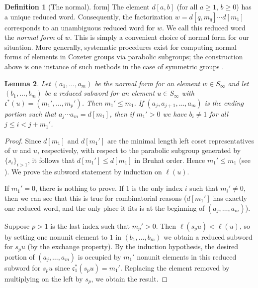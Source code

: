 \documentclass{amsart}
\newtheorem{lemma}{Lemma}[subsection]
\theoremstyle{definition}
\newtheorem{definition}[lemma]{Definition}
\theoremstyle{remark}
\numberwithin{equation}{subsection}
\newcommand{\code}{\mathfrak{c}}
\begin{document}
\begin{definition}[The normal] form]
The element $d[a,b]$ (for all $a\geq 1$, $b\geq 0$) has a unique reduced word. Consequently, the factorization $w=d[q,m_q]\cdots d[m_1]$ corresponds to an unambiguous reduced word for $w$. We call this reduced word the \emph{normal form} of $w$. This is simply a convenient choice of normal form for our situation. More generally, systematic procedures exist for computing normal forms of elements in Coxeter groups via parabolic subgroups; the construction above is one instance of such methods in the case of symmetric groups \cite{combcox}.
\end{definition}

\begin{lemma} \label{lemma:subword}
Let $(a_1,\ldots,a_m)$ be the normal form for an element $w\in S_\infty$ and let $(b_1,\ldots,b_m)$ be a reduced subword for an element $u\in S_\infty$ with $\code^*(u)=(m_1',\ldots,m_p')$. Then $m_1'\leq m_1$. If $(a_j,a_{j+1},\ldots,a_m)$ is the ending portion such that $a_j\cdots a_m=d[m_1]$, then if $m_1'>0$ we have $b_i\neq 1$ for all $j\leq i<j+m_1'$.
\end{lemma}
\begin{proof}
Since $d[m_1]$ and $d[m_1']$ are the minimal length left coset representatives of $w$ and $u$, respectively, with respect to the parabolic subgroup generated by $\{s_i\}_{i>1}$, it follows that $d[m_1']\leq d[m_1]$ in Bruhat order. Hence $m_1'\leq m_1$ (see \cite{combcox}). We prove the subword statement by induction on $\ell(u)$. 


If $m_1'=0$, there is nothing to prove. 
If $1$ is the only index $i$ such that $m_i'\neq 0$, then we can see that this is true for combinatorial reasons ($d[m_1']$ has exactly one reduced word, and the only place it fits is at the beginning of $(a_j,\ldots,a_m)$). 

Suppose $p>1$ is the last index such that $m_p'>0$. Then $\ell(s_pu)<\ell(u)$, so by setting one nonunit element to $1$ in $(b_1,\ldots,b_m)$ we obtain a reduced subword for $s_pu$ (by the exchange property). By the induction hypothesis, the desired portion of $(a_j,\ldots,a_m)$ is occupied by $m_1'$ nonunit elements in this reduced subword for $s_pu$ since $\code_1^*(s_pu)=m_1'$. Replacing the element removed by multiplying on the left by $s_p$, we obtain the result.
\end{proof}
\end{document}
